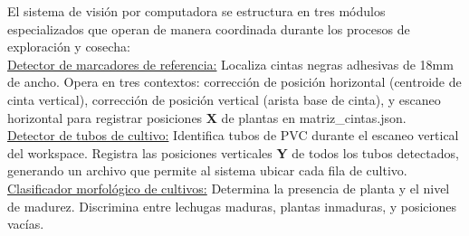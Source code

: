 El sistema de visión por computadora se estructura en tres módulos especializados que operan de manera coordinada durante los procesos de exploración y cosecha:\\

\underline{Detector de marcadores de referencia:} Localiza cintas negras adhesivas de 18mm de ancho. Opera en tres contextos: corrección de posición horizontal (centroide de cinta vertical), corrección de posición vertical (arista base de cinta), y escaneo horizontal para registrar posiciones \textbf{X} de plantas en matriz\_cintas.json.\\

\underline{Detector de tubos de cultivo:} Identifica tubos de PVC durante el escaneo vertical del workspace. Registra las posiciones verticales \textbf{Y} de todos los tubos detectados, generando un archivo que permite al sistema ubicar cada fila de cultivo.\\

\underline{Clasificador morfológico de cultivos:} Determina la presencia de planta y el nivel de madurez. Discrimina entre lechugas maduras, plantas inmaduras, y posiciones vacías.

